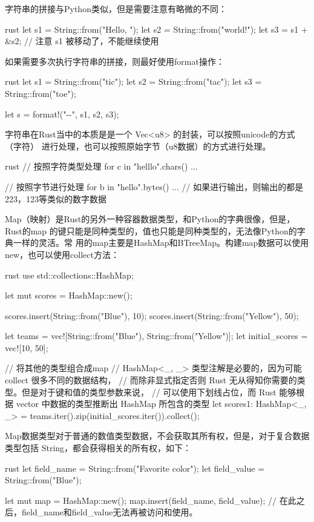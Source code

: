 字符串的拼接与Python类似，但是需要注意有略微的不同：
\begin{code-block}{rust}
let s1 = String::from("Hello, ");
let s2 = String::from("world!");
let s3 = s1 + &s2; // 注意 s1 被移动了，不能继续使用
\end{code-block}

如果需要多次执行字符串的拼接，则最好使用format操作：
\begin{code-block}{rust}
let s1 = String::from("tic");
let s2 = String::from("tac");
let s3 = String::from("toe");

let s = format!("{}-{}-{}", s1, s2, s3);
\end{code-block}

字符串在Rust当中的本质是是一个 Vec<u8> 的封装，可以按照unicode的方式（字符）
进行处理，也可以按照原始字节（u8数据）的方式进行处理。
\begin{code-block}{rust}
// 按照字符类型处理
for c in "helllo".chars() {
    ...
}

// 按照字节进行处理
for b in "hello".bytes() {
    ... // 如果进行输出，则输出的都是223，123等类似的数字数据
}
\end{code-block}

Map（映射）是Rust的另外一种容器数据类型，和Python的字典很像，但是，Rust的map
的键只能是同种类型的，值也只能是同种类型的，无法像Python的字典一样的灵活。常
用的map主要是HashMap和BTreeMap。构建map数据可以使用new，也可以使用collect方法：
\begin{code-block}{rust}
use std::collections::HashMap;

let mut scores = HashMap::new();

scores.insert(String::from("Blue"), 10);
scores.insert(String::from("Yellow"), 50);

let teams  = vec![String::from("Blue"), String::from("Yellow")];
let initial_scores = vec![10, 50];

// 将其他的类型组合成map
// HashMap<_, _> 类型注解是必要的，因为可能 collect 很多不同的数据结构，
// 而除非显式指定否则 Rust 无从得知你需要的类型。但是对于键和值的类型参数来说，
// 可以使用下划线占位，而 Rust 能够根据 vector 中数据的类型推断出 HashMap 所包含的类型
let scores1: HashMap<_, _> = teams.iter().zip(initial_scores.iter()).collect();
\end{code-block}

Map数据类型对于普通的数值类型数据，不会获取其所有权，但是，对于复合数据类型包括
String，都会获得相关的所有权，如下：
\begin{code-block}{rust}
let field_name = String::from("Favorite color");
let field_value = String::from("Blue");

let mut map = HashMap::new();
map.insert(field_name, field_value);
// 在此之后，field_name和field_value无法再被访问和使用。
\end{code-block}

